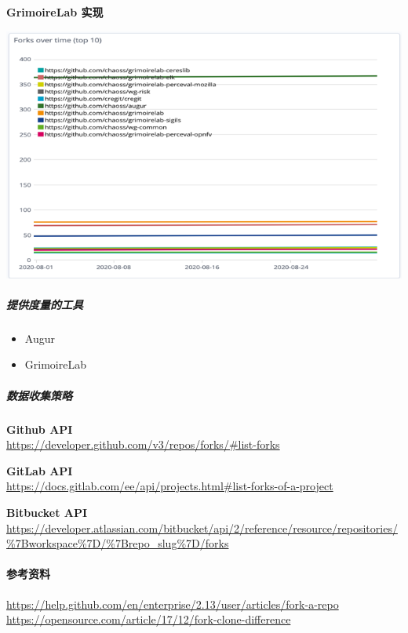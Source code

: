 \textbf{GrimoireLab 实现}

\includegraphics{images/technical-fork_grimoirelab-fork.png}

\hypertarget{ux63d0ux4f9bux5ea6ux91cfux7684ux5de5ux5177}{%
\subparagraph{提供度量的工具}\label{ux63d0ux4f9bux5ea6ux91cfux7684ux5de5ux5177}}

\begin{itemize}
\tightlist
\item
  Augur
\item
  GrimoireLab
\end{itemize}

\hypertarget{ux6570ux636eux6536ux96c6ux7b56ux7565}{%
\subparagraph{数据收集策略}\label{ux6570ux636eux6536ux96c6ux7b56ux7565}}

\textbf{Github API}\\
\href{https://developer.github.com/v3/repos/forks/\#list-forks}{https://developer.github.com/v3/repos/forks/\#list-forks}

\textbf{GitLab API}\\
\href{https://docs.gitlab.com/ee/api/projects.html\#list-forks-of-a-project}{https://docs.gitlab.com/ee/api/projects.html\#list-forks-of-a-project}

\textbf{Bitbucket API}\\
\href{https://developer.atlassian.com/bitbucket/api/2/reference/resource/repositories/\%7Bworkspace\%7D/\%7Brepo_slug\%7D/forks}{https://developer.atlassian.com/bitbucket/api/2/reference/resource/repositories/\%7Bworkspace\%7D/\%7Brepo\_slug\%7D/forks}

\hypertarget{ux53c2ux8003ux8d44ux6599}{%
\paragraph{参考资料}\label{ux53c2ux8003ux8d44ux6599}}

\href{https://help.github.com/en/enterprise/2.13/user/articles/fork-a-repo}{https://help.github.com/en/enterprise/2.13/user/articles/fork-a-repo}
\href{https://opensource.com/article/17/12/fork-clone-difference}{https://opensource.com/article/17/12/fork-clone-difference}
